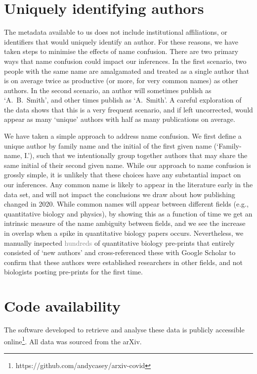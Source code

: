 \documentclass{nature}
\newcommand{\todo}[1]{\textcolor{gray}{#1}}
\newcommand{\arxiv}{arXiv}
\begin{document}
\begin{methods}
\section*{Uniquely identifying authors}

The metadata available to us does not include institutional affiliations, or identifiers that would uniquely identify an author. For these reasons, we have taken steps to minimise the effects of name confusion. There are two primary ways that name confusion could impact our inferences. In the first scenario, two people with the same name are amalgamated and treated as a single author that is on average twice as productive (or more, for very common names) as other authors. In the second scenario, an author will sometimes publish as `A.~B.~Smith', and other times publish as `A.~Smith'. A careful exploration of the data shows that this is a very frequent scenario, and if left uncorrected, would appear as many `unique' authors with half as many publications on average.

We have taken a simple approach to address name confusion. We first define a unique author by family name and the initial of the first given name (`Family-name, I.'), such that we intentionally group together authors that may share the same initial of their second given name. While our approach to name confusion is grossly simple, it is unlikely that these choices have any substantial impact on our inferences. Any common name is likely to appear in the literature early in the data set, and will not impact the conclusions we draw about how publishing changed in 2020. While common names will appear between different fields (e.g., quantitative biology and physics), by showing this as a function of time we get an intrinsic measure of the name ambiguity between fields, and we see the increase in overlap when a spike in quantitative biology papers occurs. 
Nevertheless, we manually inspected \todo{hundreds} of quantitative biology pre-prints that entirely consisted of `new authors' and cross-referenced these with Google Scholar to confirm that these authors were established researchers in other fields, and not biologists posting pre-prints for the first time.


\section*{Code availability}
The software developed to retrieve and analyse these data is publicly accessible online\footnote{https://github.com/andycasey/arxiv-covid}. All data was sourced from the \arxiv.

\end{methods}
\end{document}

